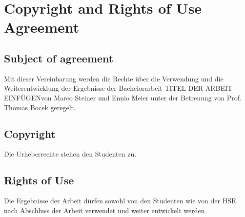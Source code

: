\chapter{Copyright and Rights of Use Agreement}
\section{Subject of agreement}
Mit dieser Vereinbarung werden die Rechte über die Verwendung und die Weiterentwicklung der Ergebnisse der Bachelorarbeit \flqq TITEL DER ARBEIT EINFÜGEN\frqq{ }von Marco Steiner und Ennio Meier unter der Betreuung von Prof. Thomas Bocek geregelt.
\section{Copyright}
Die Urheberrechte stehen den Studenten zu.
\section{Rights of Use}
Die Ergebnisse der Arbeit dürfen sowohl von den Studenten wie von der HSR nach Abschluss der Arbeit verwendet und weiter entwickelt werden
